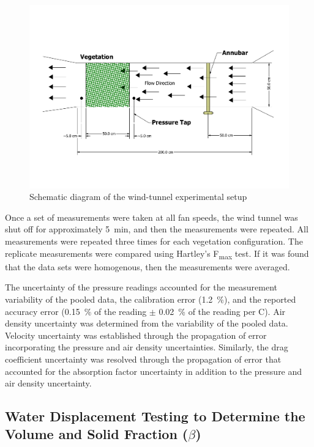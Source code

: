\documentclass[12pt]{article}
\begin{document}
\begin{figure} [!]
	\centering 	\includegraphics[width=\textwidth,keepaspectratio]{Drawing1.pdf}
	\caption{Schematic diagram of the wind-tunnel experimental setup}
	\label{fig:WindtunnelSch}
\end{figure}

Once a set of measurements were taken at all fan speeds, the wind tunnel was shut off for approximately 5~\si{min}, and then the measurements were repeated. All measurements were repeated three times for each vegetation configuration. The replicate measurements were compared using Hartley's F\textsubscript{max} test. If it was found that the data sets were homogenous, then the measurements were averaged.

The uncertainty of the pressure readings accounted for the measurement variability of the pooled data, the calibration error (1.2~\%), and the reported accuracy error (0.15~\% of the reading $\pm$ 0.02~\% of the reading per \textdegree C). Air density uncertainty was determined from the variability of the pooled data. Velocity uncertainty was established through the propagation of error incorporating the pressure and air density uncertainties. Similarly, the drag coefficient uncertainty was resolved through the propagation of error that accounted for the absorption factor uncertainty in addition to the pressure and air density uncertainty.  


\subsection{Water Displacement Testing to Determine the Volume and Solid Fraction ($\beta$)}
\label{ssec:headingscap}
\end{document}
